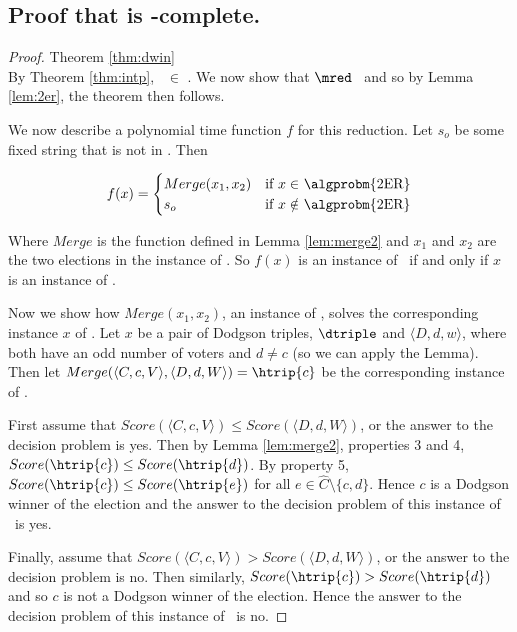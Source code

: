 \subsection{Proof that  is \tp-complete.}
\begin{proof}{Theorem \ref{thm:dwin}}\\
    By Theorem \ref{thm:intp}, \dwin~$\in$ \tp.
    We now show that  $\mred$ \dwin~and so
    by Lemma \ref{lem:2er}, the theorem then follows.

    We now describe a polynomial time function $f$ for this reduction.
    Let $s_o$ be some fixed string that is not in \dwin.
    Then

    \[
      f(x) =
      \begin{cases}
          Merge(x_1,x_2) & \text{if $x \in$ \algprobm{2ER}}  \\
          s_o & \text{if $x \notin$ \algprobm{2ER}}
      \end{cases}
    \]

    Where $Merge$ is the function defined in Lemma \ref{lem:merge2} and
    $x_1$ and $x_2$ are the two elections in the instance of .
    So $f(x)$ is an instance of \dwin~if and only if $x$ is an instance of
    .

    Now we show how $Merge(x_1,x_2)$, an instance of \dwin, solves the
    corresponding instance $x$ of .
    Let $x$ be a pair of Dodgson triples, $\dtriple$ and
    $\langle D,d,w \rangle$, where both have an odd number of voters
    and $d \neq c$ (so we can apply the Lemma).
    Then let $Merge(\langle C,c,V \rangle, \langle D,d,W \rangle) =
    \htrip{c}$ be the corresponding instance of \dwin.

    First assume that $Score(\langle C,c,V \rangle)\leq Score(\langle D,d,W \rangle)$, or the
    answer to the  decision problem is yes.
    Then by Lemma \ref{lem:merge2}, properties 3 and 4,
    $Score(\htrip{c}) \leq Score(\htrip{d})$.
    By property 5, $Score(\htrip{c}) \leq Score(\htrip{e})$ for all
    $e \in \hat{C}\setminus \{c,d\}$.
    Hence $c$ is a Dodgson winner of the election and the answer
    to the decision problem of this instance of \dwin~is yes.

    Finally, assume that $Score(\langle C,c,V \rangle)> Score(\langle D,d,W \rangle)$, or the
    answer to the  decision problem is no.
    Then similarly, $Score(\htrip{c}) > Score(\htrip{d})$ and
    so $c$ is not a Dodgson winner of the election.
    Hence the answer to the decision problem of this instance of \dwin~is
    no.

\end{proof}